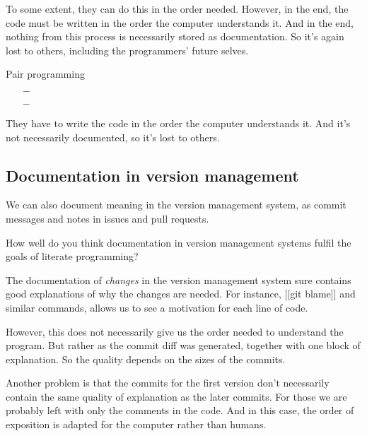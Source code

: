 To some extent, they can do this in the order needed.
However, in the end, the code must be written in the order the computer 
understands it.
And in the end, nothing from this process is necessarily stored as 
documentation.
So it's again lost to others, including the programmers' future selves.

\begin{frame}
\begin{block}{Pair programming}
  \begin{itemize}
    \item[\(-\)] {\color{red}\LPexplain}
    \item[\(-\)] {\color{red}\LPorder}
  \end{itemize}
\end{block}

\begin{remark}
  They have to write the code in the order the computer understands it.
  And it's not necessarily documented, so it's lost to others.
\end{remark}
\end{frame}

\subsection{Documentation in version management}

We can also document meaning in the version management system, as commit 
messages and notes in issues and pull requests.

\begin{frame}
\begin{activity}
How well do you think documentation in version management systems fulfil the 
goals of literate programming?
\end{activity}
\end{frame}

The documentation of \emph{changes} in the version management system sure 
contains good explanations of why the changes are needed.
For instance, [[git blame]] and similar commands, allows us to see a motivation 
for each line of code.

However, this does not necessarily give us the order needed to understand the 
program.
But rather as the commit diff was generated, together with one block of 
explanation.
So the quality depends on the sizes of the commits.

Another problem is that the commits for the first version don't necessarily 
contain the same quality of explanation as the later commits.
For those we are probably left with only the comments in the code.
And in this case, the order of exposition is adapted for the computer rather 
than humans.

